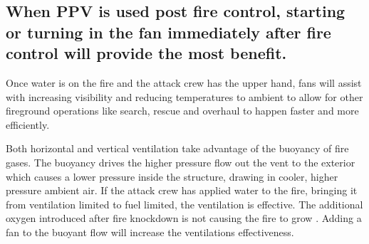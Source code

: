 \documentclass{article}
\begin{document}
\subsection{When PPV is used post fire control, starting or turning in the fan immediately after fire control will provide the most benefit.}  
Once water is on the fire and the attack crew has the upper hand, fans will assist with increasing visibility and reducing temperatures to ambient to allow for other fireground operations like search, rescue and overhaul to happen faster and more efficiently.  

Both horizontal and vertical ventilation take advantage of the buoyancy of fire gases. The buoyancy drives the higher pressure flow out the vent to the exterior which causes a lower pressure inside the structure, drawing in cooler, higher pressure ambient air. If the attack crew has applied water to the fire, bringing it from ventilation limited to fuel limited, the ventilation is effective. The additional oxygen introduced after fire knockdown is not causing the fire to grow \cite{DHS2008} \cite{DHS2010}. Adding a fan to the buoyant flow will increase the ventilations effectiveness. 
\end{document}
